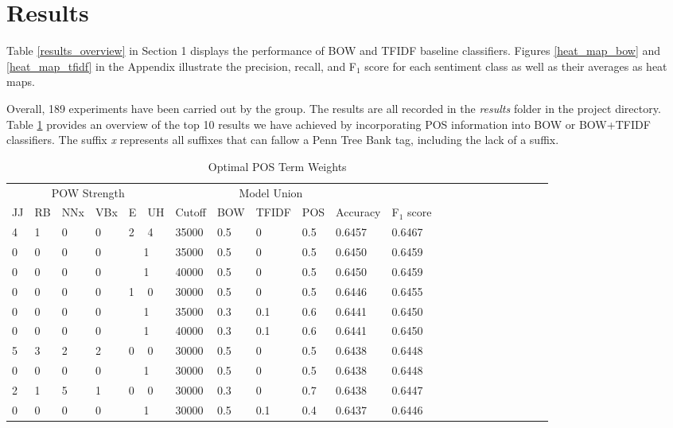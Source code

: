 \documentclass[titlepage]{article}
\begin{document}
          
          
\section{Results}
      
      Table \ref{results_overview} in Section 1 displays the performance of BOW and TFIDF baseline classifiers. Figures \ref{heat_map_bow} and \ref{heat_map_tfidf} in the Appendix illustrate the precision, recall, and F$_{1}$ score for each sentiment class as well as their averages as heat maps.
       
     
Overall, 189 experiments have been carried out by the group. The results are all recorded in the \textit{results} folder in the project directory. Table \ref{top10} provides an overview of the top 10 results we have achieved by incorporating POS information into BOW or BOW+TFIDF classifiers. The suffix \textit{x} represents all suffixes that can fallow a Penn Tree Bank tag, including the lack of a suffix. 
     
\begin{table}[htbp]
  \centering

  \begin{tabular}{*{11}{ll}}
    \toprule
    \multicolumn{6}{c}{POW Strength} & & \multicolumn{3}{c}{Model Union} \\
    \cmidrule(lr){1-6}   
    \cmidrule(lr){8-10} 
    JJ & RB & NNx & VBx & E & UH & Cutoff & BOW & TFIDF & POS & Accuracy & F$_{1}$ score  \\
    \midrule
    4 & 1 & 0 & 0 & 2 & 4 & 35000 & 0.5 & 0 & 0.5 & 0.6457 & 0.6467\\
   0 & 0 & 0 & 0 & \multicolumn{2}{c}{1} & 35000 & 0.5 & 0 & 0.5 & 0.6450 & 0.6459\\
     0 & 0 & 0 & 0 & \multicolumn{2}{c}{1}  & 40000 & 0.5 & 0 & 0.5 & 0.6450 & 0.6459\\
      0 & 0 & 0 & 0 & 1 & 0 & 30000 & 0.5 & 0 & 0.5 & 0.6446 & 0.6455\\
      0 & 0 & 0 & 0 & \multicolumn{2}{c}{1}  & 35000 & 0.3 & 0.1 & 0.6 & 0.6441 & 0.6450\\
      0 & 0 & 0 & 0 & \multicolumn{2}{c}{1}  & 40000 & 0.3 & 0.1 & 0.6 & 0.6441 & 0.6450\\
      5 & 3 & 2 & 2 & 0 & 0 & 30000 & 0.5 & 0 & 0.5 & 0.6438 & 0.6448\\
      0 & 0 & 0 & 0 & \multicolumn{2}{c}{1}  & 30000 & 0.5 & 0 & 0.5 & 0.6438 & 0.6448\\      
      2 & 1 & 5 & 1 & 0 & 0 & 30000 & 0.3 & 0 & 0.7 & 0.6438 & 0.6447\\
      0 & 0 & 0 & 0 & \multicolumn{2}{c}{1}  & 30000 & 0.5 & 0.1 & 0.4 & 0.6437 & 0.6446\\      
    \bottomrule
  \end{tabular}
    \caption{Optimal POS Term Weights}
  \label{top10}
\end{table}
\end{document}
